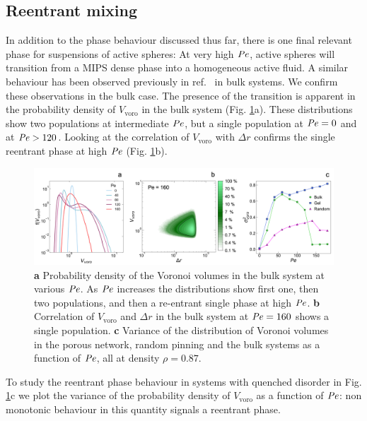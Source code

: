  


\subsection{Reentrant mixing}
\label{section:Re-entrant dynamics}

In addition to the phase behaviour discussed thus far, there is one final relevant phase for suspensions of active spheres: At very high $\operatorname{\mathit{P\kern-.08em e}}$, active spheres will transition from a MIPS dense phase into a homogeneous active fluid. A similar behaviour has been observed previously in ref.~\cite{bialke2013,stenhammar2014,su2022} in bulk systems.
We confirm these observations in the bulk case. The presence of the transition is apparent in the probability density of $V_{\textrm{voro}}$ in the bulk system (Fig. \ref{fig:re-entant}a). These distributions show two populations at  intermediate $\operatorname{\mathit{P\kern-.08em e}}$, but a single population at $\operatorname{\mathit{P\kern-.08em e}}=0$ and at $\operatorname{\mathit{P\kern-.08em e}} > 120$. Looking at the correlation of $V_{\textrm{voro}}$ with $\Delta r$ confirms the single reentrant phase at high $\operatorname{\mathit{P\kern-.08em e}}$ (Fig. \ref{fig:re-entant}b). 
\begin{figure}
	\centering
	\includegraphics[width=\linewidth]{chapters/activeConfinement/figsActiveConfinement/figRe-entrant.png}
	\caption[Reentrant phase separation]{\textbf{a} Probability density of the Voronoi volumes in the bulk system at various $\operatorname{\mathit{P\kern-.08em e}}$. As $\operatorname{\mathit{P\kern-.08em e}}$ increases the distributions show first one, then two populations, and then a re-entrant single phase at high $\operatorname{\mathit{P\kern-.08em e}}$. \textbf{b} Correlation of $V_{\textrm{voro}}$ and $\Delta r$ in the bulk system at $\operatorname{\mathit{P\kern-.08em e}}=160$ shows a single population. \textbf{c} Variance of the distribution of Voronoi volumes in the porous network, random pinning and the bulk systems as a function of $\operatorname{\mathit{P\kern-.08em e}}$, all at density $\rho = 0.87$.}
	\label{fig:re-entant}
\end{figure}
To study the reentrant phase behaviour in systems with quenched disorder in Fig. \ref{fig:re-entant}c we plot the variance of the probability density of $V_{\textrm{voro}}$ as a function of $\operatorname{\mathit{P\kern-.08em e}}$: non monotonic behaviour in this quantity signals a reentrant phase.
